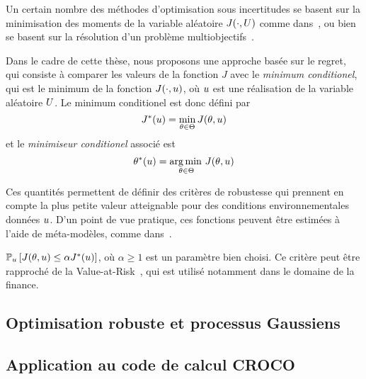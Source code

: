 \documentclass[../../Main_ManuscritThese.tex]{subfiles}
\begin{document}
Un certain nombre des méthodes d'optimisation sous incertitudes se
basent sur la minimisation des moments de la variable aléatoire
$J(\mathbf{\cdot}, U)$ comme
dans~\cite{lehman_designing_2004,janusevskis_simultaneous_2010}, ou
bien se basent sur la résolution d'un problème
multiobjectifs~\cite{baudoui_optimisation_2012,ribaud_krigeage_2018}.

Dans le cadre de cette thèse, nous proposons une approche basée sur le
regret, qui consiste à comparer les valeurs de la fonction $J$ avec le
\emph{minimum conditionel}, qui est le minimum de la fonction
$J(\cdot, u)$, où $u$ est une réalisation de la variable aléatoire
$U$. Le minimum conditionel est donc défini par
\begin{equation}
  \label{eq:Jstar}
  J^*(u) = \min_{\theta\in\Theta} J(\theta,u)
\end{equation}
et le \emph{minimiseur conditionel} associé est
\begin{equation}
  \label{eq:Kstar}
  \theta^*(u) = \operatorname*{arg\,min \,}_{\theta\in \Theta}J(\theta,u)
\end{equation}

\cite{trappler_robust_2020}
Ces quantités permettent de définir des critères de robustesse qui
prennent en compte la plus petite valeur atteignable pour des
conditions environnementales données $u$.  D'un point de vue
pratique, ces fonctions peuvent être estimées à l'aide de
méta-modèles, comme dans~\cite{ginsbourger_bayesian_2014}.
 

$\mathbb{P}_{u}\left[J(\theta,u) \leq \alpha J^*(u) \right]$, où
$\alpha \geq 1$ est un paramètre bien choisi. Ce critère peut être
rapproché de la Value-at-Risk~\cite{rockafellar_deviation_2002}, qui
est utilisé notamment dans le domaine de la finance.

\subsection*{Optimisation robuste et processus Gaussiens}
\subsection*{Application au code de calcul CROCO}
\end{document}
